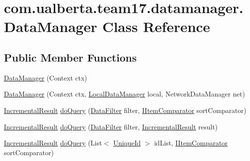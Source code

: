 \hypertarget{classcom_1_1ualberta_1_1team17_1_1datamanager_1_1_data_manager}{\section{com.\+ualberta.\+team17.\+datamanager.\+Data\+Manager Class Reference}
\label{classcom_1_1ualberta_1_1team17_1_1datamanager_1_1_data_manager}
}
\subsection*{Public Member Functions}
\begin{DoxyCompactItemize}
\item 
\hyperlink{classcom_1_1ualberta_1_1team17_1_1datamanager_1_1_data_manager_a77711fe5348c9c2bf1667fae636e86eb}{Data\+Manager} (Context ctx)
\item 
\hyperlink{classcom_1_1ualberta_1_1team17_1_1datamanager_1_1_data_manager_aa9632583f750c2d1415e84503906fe46}{Data\+Manager} (Context ctx, \hyperlink{classcom_1_1ualberta_1_1team17_1_1datamanager_1_1_local_data_manager}{Local\+Data\+Manager} local, Network\+Data\+Manager net)
\item 
\hyperlink{classcom_1_1ualberta_1_1team17_1_1datamanager_1_1_incremental_result}{Incremental\+Result} \hyperlink{classcom_1_1ualberta_1_1team17_1_1datamanager_1_1_data_manager_af268046cb6b755358c4367ba47da8f10}{do\+Query} (\hyperlink{classcom_1_1ualberta_1_1team17_1_1datamanager_1_1_data_filter}{Data\+Filter} filter, \hyperlink{interfacecom_1_1ualberta_1_1team17_1_1datamanager_1_1_i_item_comparator}{I\+Item\+Comparator} sort\+Comparator)
\item 
\hyperlink{classcom_1_1ualberta_1_1team17_1_1datamanager_1_1_incremental_result}{Incremental\+Result} \hyperlink{classcom_1_1ualberta_1_1team17_1_1datamanager_1_1_data_manager_a7b27f1cbc31c2ea4f3a19f1186005d45}{do\+Query} (\hyperlink{classcom_1_1ualberta_1_1team17_1_1datamanager_1_1_data_filter}{Data\+Filter} filter, \hyperlink{classcom_1_1ualberta_1_1team17_1_1datamanager_1_1_incremental_result}{Incremental\+Result} result)
\item 
\hyperlink{classcom_1_1ualberta_1_1team17_1_1datamanager_1_1_incremental_result}{Incremental\+Result} \hyperlink{classcom_1_1ualberta_1_1team17_1_1datamanager_1_1_data_manager_a47c40b9c562390ed1420afb97d52b58d}{do\+Query} (List$<$ \hyperlink{classcom_1_1ualberta_1_1team17_1_1_unique_id}{Unique\+Id} $>$ id\+List, \hyperlink{interfacecom_1_1ualberta_1_1team17_1_1datamanager_1_1_i_item_comparator}{I\+Item\+Comparator} sort\+Comparator)

\end{DoxyCompactItemize}
